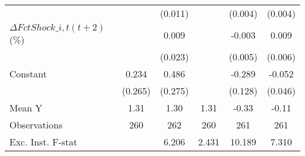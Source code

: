 {\begin{tabular}{l*{5}{c}}
                    &                     &     (0.011)         &                     &     (0.004)         &     (0.004)         \\
\addlinespace
$ \Delta FctShock\_{i,t}(t+2)$ (\%)&                     &       0.009         &                     &      -0.003         &       0.009         \\
                    &                     &     (0.023)         &                     &     (0.005)         &     (0.006)         \\
\addlinespace
Constant            &       0.234         &       0.486\sym{*}  &                     &      -0.289\sym{**} &      -0.052         \\
                    &     (0.265)         &     (0.275)         &                     &     (0.128)         &     (0.046)         \\
\midrule
Mean Y              &        1.31         &        1.30         &        1.31         &       -0.33         &       -0.11         \\
Observations        &         260         &         262         &         260         &         261         &         261         \\
Exc. Inst. F-stat   &                     &       6.206         &       2.431         &      10.189         &       7.310         \\
\bottomrule
\end{tabular}
}
